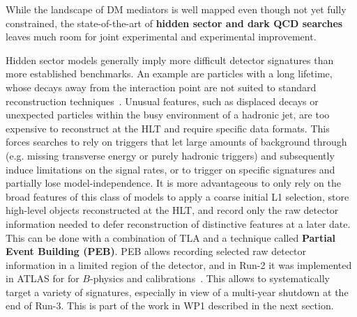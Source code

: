  
While the landscape of DM mediators is well mapped even though not yet fully constrained, 
the state-of-the-art of \textbf{hidden sector and dark QCD searches} leaves much room for joint experimental and experimental improvement.

Hidden sector models generally imply more difficult detector signatures than more established benchmarks. 
An example are particles with a long lifetime, whose decays away from the interaction point are not suited to standard reconstruction techniques~\cite{ToBeCited}.
Unusual features, such as displaced decays or unexpected particles within the busy environment of a hadronic jet, are too expensive to reconstruct at the HLT and require specific data formats. %
This forces searches to rely on triggers that let large amounts of background through (e.g. missing transverse energy or purely hadronic triggers) and subsequently induce limitations on the signal rates, or to trigger on specific signatures and partially lose model-independence. 
It is more advantageous to only rely on the broad features of this class of models to apply a coarse initial L1 selection, store high-level objects reconstructed at the HLT, and record only the raw detector information needed to defer reconstruction of distinctive features at a later date. This can be done with a combination of TLA and a technique called \textbf{Partial Event Building (PEB)}. PEB allows recording selected raw detector information in a limited region of the detector, and in Run-2 it was implemented in ATLAS for for $B$-physics and calibrations~\cite{ToBeCited}.%
This allows to systematically target a variety of signatures, especially in view of a multi-year shutdown at the end of Run-3. 
This is part of the work in WP1 described in the next section. 

